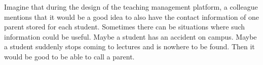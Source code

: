 %
%
Imagine that during the design of the teaching management platform, a colleague mentions that it would be a good idea to also have the contact information of one parent stored for each student.
Sometimes there can be situations where such information could be useful.
Maybe a student has an accident on campus.
Maybe a student suddenly stops coming to lectures and is nowhere to be found.
Then it would be good to be able to call a parent.%
%
%
%
%
\endhsection%
%
